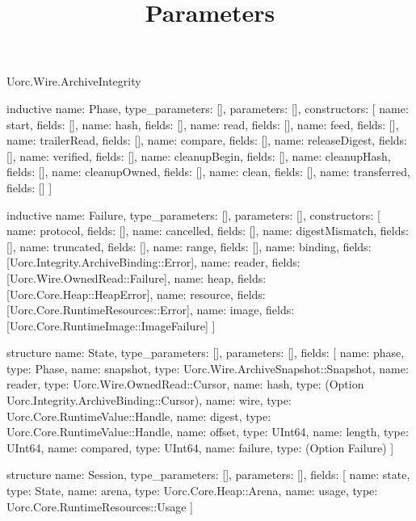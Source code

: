 \begin{lexlean}{Uorc.Wire.ArchiveIntegrity}
\title{Parameters}
\begin{semanticmodule}
inductive{
  name: Phase,
  type_parameters: [],
  parameters: [],
  constructors: [
    {name: start, fields: []},
    {name: hash, fields: []},
    {name: read, fields: []},
    {name: feed, fields: []},
    {name: trailerRead, fields: []},
    {name: compare, fields: []},
    {name: releaseDigest, fields: []},
    {name: verified, fields: []},
    {name: cleanupBegin, fields: []},
    {name: cleanupHash, fields: []},
    {name: cleanupOwned, fields: []},
    {name: clean, fields: []},
    {name: transferred, fields: []}
  ]
}

inductive{
  name: Failure,
  type_parameters: [],
  parameters: [],
  constructors: [
    {name: protocol, fields: []},
    {name: cancelled, fields: []},
    {name: digestMismatch, fields: []},
    {name: truncated, fields: []},
    {name: range, fields: []},
    {name: binding, fields: [Uorc.Integrity.ArchiveBinding::Error]},
    {name: reader, fields: [Uorc.Wire.OwnedRead::Failure]},
    {name: heap, fields: [Uorc.Core.Heap::HeapError]},
    {name: resource, fields: [Uorc.Core.RuntimeResources::Error]},
    {name: image, fields: [Uorc.Core.RuntimeImage::ImageFailure]}
  ]
}

structure{
  name: State,
  type_parameters: [],
  parameters: [],
  fields: [
    {name: phase, type: Phase},
    {name: snapshot, type: Uorc.Wire.ArchiveSnapshot::Snapshot},
    {name: reader, type: Uorc.Wire.OwnedRead::Cursor},
    {name: hash, type: (Option Uorc.Integrity.ArchiveBinding::Cursor)},
    {name: wire, type: Uorc.Core.RuntimeValue::Handle},
    {name: digest, type: Uorc.Core.RuntimeValue::Handle},
    {name: offset, type: UInt64},
    {name: length, type: UInt64},
    {name: compared, type: UInt64},
    {name: failure, type: (Option Failure)}
  ]
}

structure{
  name: Session,
  type_parameters: [],
  parameters: [],
  fields: [
    {name: state, type: State},
    {name: arena, type: Uorc.Core.Heap::Arena},
    {name: usage, type: Uorc.Core.RuntimeResources::Usage}
  ]
}


\end{semanticmodule}
\end{lexlean}
